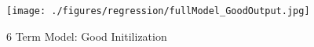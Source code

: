 \begin{figure}[ht!]
\texttt{[image: ./figures/regression/fullModel\_GoodOutput.jpg]}
\centering
\caption{6 Term Model: Good Initilization}
\label{fig:fullModel_GoodOutput}
\end{figure}
